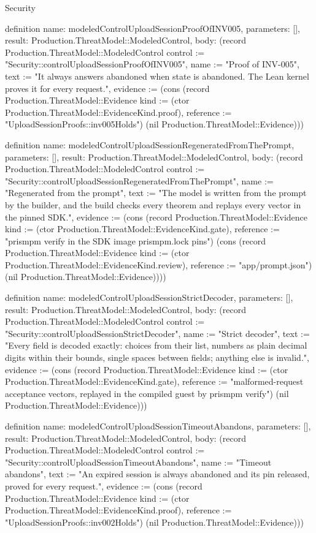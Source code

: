 \begin{lexlean}{Security}
\begin{semanticmodule}
definition{
  name: modeledControlUploadSessionProofOfINV005,
  parameters: [],
  result: Production.ThreatModel::ModeledControl,
  body: (record Production.ThreatModel::ModeledControl {control := "Security::controlUploadSessionProofOfINV005", name := "Proof of INV-005", text := "It always answers abandoned when state is abandoned. The Lean kernel proves it for every request.", evidence := (cons (record Production.ThreatModel::Evidence {kind := (ctor Production.ThreatModel::EvidenceKind.proof), reference := "UploadSessionProofs::inv005Holds"}) (nil Production.ThreatModel::Evidence))})
}

definition{
  name: modeledControlUploadSessionRegeneratedFromThePrompt,
  parameters: [],
  result: Production.ThreatModel::ModeledControl,
  body: (record Production.ThreatModel::ModeledControl {control := "Security::controlUploadSessionRegeneratedFromThePrompt", name := "Regenerated from the prompt", text := "The model is written from the prompt by the builder, and the build checks every theorem and replays every vector in the pinned SDK.", evidence := (cons (record Production.ThreatModel::Evidence {kind := (ctor Production.ThreatModel::EvidenceKind.gate), reference := "prismpm verify in the SDK image prismpm.lock pins"}) (cons (record Production.ThreatModel::Evidence {kind := (ctor Production.ThreatModel::EvidenceKind.review), reference := "app/prompt.json"}) (nil Production.ThreatModel::Evidence)))})
}

definition{
  name: modeledControlUploadSessionStrictDecoder,
  parameters: [],
  result: Production.ThreatModel::ModeledControl,
  body: (record Production.ThreatModel::ModeledControl {control := "Security::controlUploadSessionStrictDecoder", name := "Strict decoder", text := "Every field is decoded exactly: choices from their list, numbers as plain decimal digits within their bounds, single spaces between fields; anything else is invalid.", evidence := (cons (record Production.ThreatModel::Evidence {kind := (ctor Production.ThreatModel::EvidenceKind.gate), reference := "malformed-request acceptance vectors, replayed in the compiled guest by prismpm verify"}) (nil Production.ThreatModel::Evidence))})
}

definition{
  name: modeledControlUploadSessionTimeoutAbandons,
  parameters: [],
  result: Production.ThreatModel::ModeledControl,
  body: (record Production.ThreatModel::ModeledControl {control := "Security::controlUploadSessionTimeoutAbandons", name := "Timeout abandons", text := "An expired session is always abandoned and its pin released, proved for every request.", evidence := (cons (record Production.ThreatModel::Evidence {kind := (ctor Production.ThreatModel::EvidenceKind.proof), reference := "UploadSessionProofs::inv002Holds"}) (nil Production.ThreatModel::Evidence))})
}


\end{semanticmodule}
\end{lexlean}
